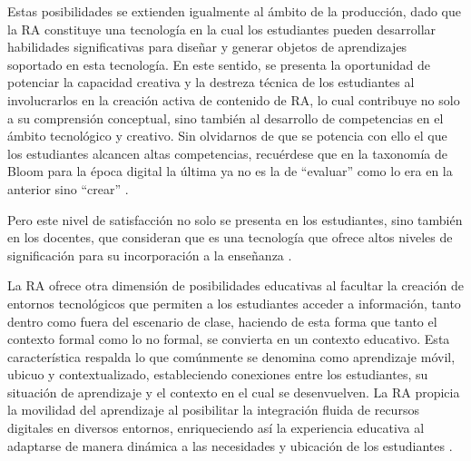 \documentclass[spanish]{textolivre}
\begin{document}
Estas posibilidades se extienden igualmente al ámbito de la producción, dado que la RA constituye una tecnología en la cual los estudiantes pueden desarrollar habilidades significativas para diseñar y generar objetos de aprendizajes soportado en esta tecnología. En este sentido, se presenta la oportunidad de potenciar la capacidad creativa y la destreza técnica de los estudiantes al involucrarlos en la creación activa de contenido de RA, lo cual contribuye no solo a su comprensión conceptual, sino también al desarrollo de competencias en el ámbito tecnológico y creativo. Sin olvidarnos de que se potencia con ello el que los estudiantes alcancen altas competencias, recuérdese que en la taxonomía de Bloom para la época digital la última ya no es la de “evaluar” como lo era en la anterior sino “crear” \cite{churches2020taxonomia}.

Pero este nivel de satisfacción no solo se presenta en los estudiantes, sino también en los docentes, que consideran que es una tecnología que ofrece altos niveles de significación para su incorporación a la enseñanza \cite{tzima2020harnessing}.

La RA ofrece otra dimensión de posibilidades educativas al facultar la creación de entornos tecnológicos que permiten a los estudiantes acceder a información, tanto dentro como fuera del escenario de clase, haciendo de esta forma que tanto el contexto formal como lo no formal, se convierta en un contexto educativo. Esta característica respalda lo que comúnmente se denomina como aprendizaje móvil, ubicuo y contextualizado, estableciendo conexiones entre los estudiantes, su situación de aprendizaje y el contexto en el cual se desenvuelven. La RA propicia la movilidad del aprendizaje al posibilitar la integración fluida de recursos digitales en diversos entornos, enriqueciendo así la experiencia educativa al adaptarse de manera dinámica a las necesidades y ubicación de los estudiantes \cite{sevillano2015dispositivos}.
\end{document}
